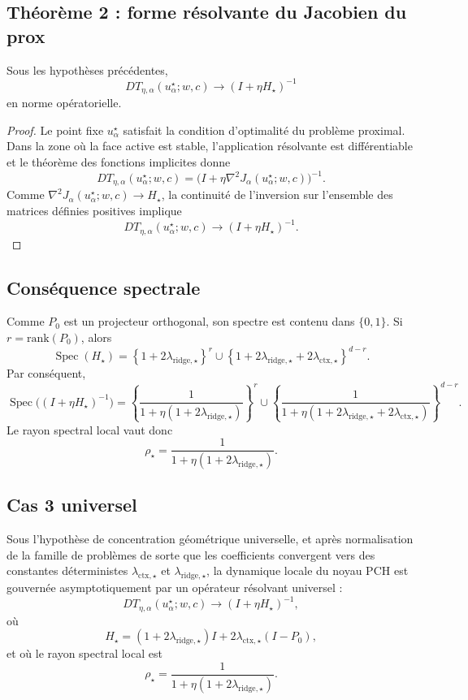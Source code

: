 \subsection{Théorème 2 : forme résolvante du Jacobien du prox}

\begin{theorem}
Sous les hypothèses précédentes,
\[
DT_{\eta,\alpha}(u_\alpha^\star;w,c)
\longrightarrow
(I+\eta H_\star)^{-1}
\]
en norme opératorielle.
\end{theorem}

\begin{proof}
Le point fixe \(u_\alpha^\star\) satisfait la condition d'optimalité du problème proximal. Dans la zone où la face active est stable, l'application résolvante est différentiable et le théorème des fonctions implicites donne
\[
DT_{\eta,\alpha}(u_\alpha^\star;w,c)
=
\bigl(I+\eta \nabla^2 J_\alpha(u_\alpha^\star;w,c)\bigr)^{-1}.
\]
Comme \(\nabla^2 J_\alpha(u_\alpha^\star;w,c)\to H_\star\), la continuité de l'inversion sur l'ensemble des matrices définies positives implique
\[
DT_{\eta,\alpha}(u_\alpha^\star;w,c)
\to
(I+\eta H_\star)^{-1}.
\]
\end{proof}

\subsection{Conséquence spectrale}

Comme \(P_0\) est un projecteur orthogonal, son spectre est contenu dans \(\{0,1\}\). Si \(r=\mathrm{rank}(P_0)\), alors
\[
\operatorname{Spec}(H_\star)
=
\left\{1+2\lambda_{\mathrm{ridge},\star}\right\}^{r}
\cup
\left\{1+2\lambda_{\mathrm{ridge},\star}+2\lambda_{\mathrm{ctx},\star}\right\}^{d-r}.
\]
Par conséquent,
\[
\operatorname{Spec}\bigl((I+\eta H_\star)^{-1}\bigr)
=
\left\{
\frac{1}{1+\eta(1+2\lambda_{\mathrm{ridge},\star})}
\right\}^{r}
\cup
\left\{
\frac{1}{1+\eta(1+2\lambda_{\mathrm{ridge},\star}+2\lambda_{\mathrm{ctx},\star})}
\right\}^{d-r}.
\]
Le rayon spectral local vaut donc
\[
\rho_\star
=
\frac{1}{1+\eta(1+2\lambda_{\mathrm{ridge},\star})}.
\]

\subsection{Cas 3 universel}

\begin{theorem}
Sous l'hypothèse de concentration géométrique universelle, et après normalisation de la famille de problèmes de sorte que les coefficients convergent vers des constantes déterministes \(\lambda_{\mathrm{ctx},\star}\) et \(\lambda_{\mathrm{ridge},\star}\), la dynamique locale du noyau PCH est gouvernée asymptotiquement par un opérateur résolvant universel :
\[
DT_{\eta,\alpha}(u_\alpha^\star;w,c)
\to
(I+\eta H_\star)^{-1},
\]
où
\[
H_\star
=
(1+2\lambda_{\mathrm{ridge},\star})I
+
2\lambda_{\mathrm{ctx},\star}(I-P_0),
\]
et où le rayon spectral local est
\[
\rho_\star
=
\frac{1}{1+\eta(1+2\lambda_{\mathrm{ridge},\star})}.
\]
\end{theorem}

